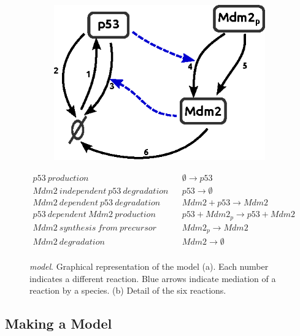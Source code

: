 \begin{figure}
 \begin{subfigure}{0.3\textwidth}
\includegraphics{handmade_figures/p53.eps}
\caption{}
 \end{subfigure}
 \begin{subtable}{0.7\textwidth}
\begin{scriptsize}
  \begin{align*}
p53~production && \emptyset\rightarrow p53 \\
Mdm2~independent~p53~degradation && p53 \rightarrow \emptyset \\
Mdm2~dependent~p53~degradation && Mdm2 + p53 \rightarrow Mdm2 \\
p53~dependent~Mdm2~production && p53 + Mdm2_{p} \rightarrow p53 + Mdm2\\
Mdm2~synthesis~from~precursor && Mdm2_{p} \rightarrow Mdm2 \\
Mdm2~degradation && Mdm2 \rightarrow \emptyset \\
\end{align*}
\end{scriptsize}
\caption{}
 \end{subtable}
\caption{\emph{\pft{} model}.
Graphical representation of the model (a). Each number indicates a different reaction.
Blue arrows indicate mediation of a reaction by a species.
(b) Detail of the six reactions.
}
\label{fig:p53}
\end{figure}

\subsection{Making a Model}

